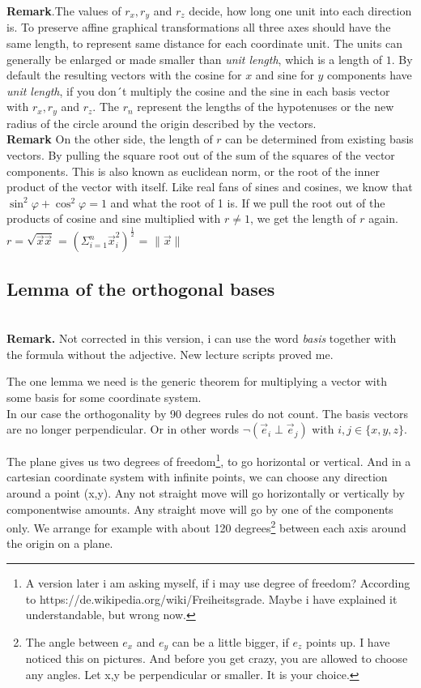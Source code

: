 \documentclass[a4paper]{article}
\begin{document}
\textbf{Remark}.The values of $r_x, r_y$ and $r_z$ decide, how long one unit into each
direction is. To preserve affine graphical transformations all three
axes should have the same length, to represent same distance for each coordinate unit. 
The units can generally be enlarged or made smaller than \emph{unit length}, which is a length of $1$. 
By default the resulting vectors with the cosine for $x$ and sine for $y$ components have \emph{unit length}, 
if you don´t multiply the cosine and the sine in each basis vector with $r_x, r_y$ and $r_z$. The $r_n$ represent the lengths of the hypotenuses or the new radius of the circle around the origin described by the vectors. \\

\textbf{Remark} On the other side, the length of $r$ can be determined from existing basis vectors.
By pulling the square root out of the sum of the squares of the vector components.
This is also known as euclidean norm, or the root of the inner product of the vector with itself.
Like real fans of sines and cosines, we know that $\sin^2 \varphi + \cos^2 \varphi = 1$ and what the root of 1 is.
If we pull the root out of the products of cosine and sine multiplied with $r \ne 1$, we get the length of $r$ again. 
$r = \sqrt{\vec{x}\vec{x}}$ = $\left(\Sigma_{i=1}^{n} \vec{x}_i^2\right)^{\frac{1}{2}}$ = $\|\vec{x}\|$\\

\subsection{Lemma of the orthogonal bases}\\

\textbf{Remark.} Not corrected in this version, i can use the word \emph{basis} together with the formula without the adjective. New lecture scripts proved me.

The one lemma we need is the generic theorem for multiplying a vector with some basis for some coordinate system.\\

In our case the orthogonality by 90 degrees rules do not count. The basis vectors are no longer perpendicular. Or in other words
$\neg \left( \vec{e}_i \perp \vec{e}_j \right)$ with $i,j \in \{x,y,z\}.$

The plane gives us two degrees of freedom\footnote{A version later i am asking myself, if i may use degree of freedom? According to https://de.wikipedia.org/wiki/Freiheitsgrade. Maybe i have explained it understandable, but wrong now.}, to go horizontal or vertical. And in a cartesian coordinate system with infinite points, we can choose any direction around a point (x,y).
Any not straight move will go horizontally or vertically by componentwise amounts. Any straight move will go by one of the components only.
We arrange for example with about 120 degrees\footnote{The angle between $e_x$ and $e_y$ can be a little bigger, if $e_z$ points up. I have noticed this on pictures. And before you get crazy, you are allowed to choose any angles. Let x,y be perpendicular or smaller. It is your choice.} between each axis around the origin on a plane. \\
\end{document}
